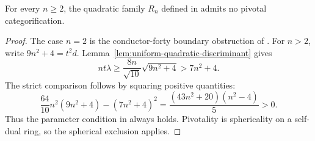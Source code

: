 \begin{corollary}\label{cor:all-quadratic-family}
For every $n\geq2$, the quadratic family $R_n$ defined in
\cite[Section~\ref{B-sec:quadratic-family}]{Finite} admits no pivotal
categorification.
\end{corollary}
\begin{proof}
The case $n=2$ is the conductor-forty boundary obstruction of \cite{Finite}.
For $n>2$, write $9n^2+4=t^2d$. Lemma~\ref{lem:uniform-quadratic-discriminant}
gives
\[
 nt\lambda\geq\frac{8n}{\sqrt{10}}\sqrt{9n^2+4}>7n^2+4.
\]
The strict comparison follows by squaring positive quantities:
\[
 \frac{64}{10}n^2(9n^2+4)-(7n^2+4)^2
 =\frac{(43n^2+20)(n^2-4)}5>0.
\]
Thus the parameter condition in \cite[Proposition~\ref{B-prop:quadratic-family-n3-n4}]{Finite}
always holds. Pivotality is sphericality on a self-dual ring, so the
spherical exclusion applies.
\end{proof}
